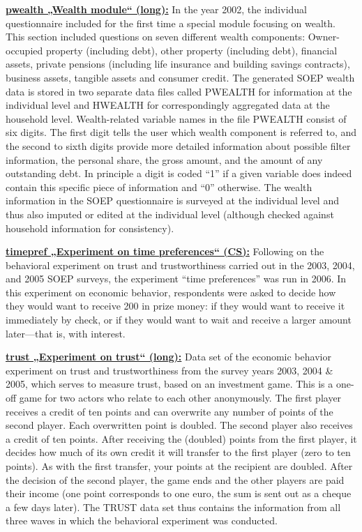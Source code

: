 \documentclass[letterpaper,10pt,openany,onesideH,english]{sphinxmanual}
\begin{document}
 \href{https://paneldata.org/soep-core/data/pwealth}{\textbf{pwealth „Wealth module“ (long):}} In the year 2002, the individual questionnaire included for the first time a special module focusing on wealth. This section included questions on seven different wealth components: Owner-occupied property (including debt), other property (including debt),  financial assets, private pensions (including life insurance and building savings contracts),  business assets,  tangible assets and  consumer credit. The generated SOEP wealth data is stored in two separate data files called PWEALTH for information at the individual level and HWEALTH for correspondingly aggregated data at the household level. Wealth-related variable names in the file PWEALTH consist of six digits. The first digit tells the user which wealth component is referred to, and the second to sixth digits provide more detailed information about possible filter information, the personal share, the gross amount, and the amount of any outstanding debt. In principle a digit is coded “1” if a given variable does indeed contain this specific piece of information and “0” otherwise.  The wealth information in the SOEP questionnaire is surveyed at the individual level and thus also imputed or edited at the individual level (although checked against household information for consistency).

 \href{https://paneldata.org/soep-core/data/timepref}{\textbf{timepref „Experiment on time preferences“ (CS):}} Following on the behavioral experiment on trust and trustworthiness carried out in the 2003, 2004, and 2005 SOEP surveys, the experiment “time preferences” was run in 2006. In this experiment on economic behavior, respondents were asked to decide how they would want to receive \texteuro{}200 in prize money: if they would want to receive it immediately by check, or if they would want to wait and receive a larger amount later—that is, with interest.

 \href{https://paneldata.org/soep-core/data/trust}{\textbf{trust „Experiment on trust“ (long):}} Data set of the economic behavior experiment on trust and trustworthiness from the survey years 2003, 2004 \& 2005, which serves to measure trust, based on an investment game. This is a one-off game for two actors who relate to each other anonymously. The first player receives a credit of ten points and can overwrite any number of points of the second player. Each overwritten point is doubled. The second player also receives a credit of ten points. After receiving the (doubled) points from the first player, it decides how much of its own credit it will transfer to the first player (zero to ten points). As with the first transfer, your points at the recipient are doubled. After the decision of the second player, the game ends and the other players are paid their income (one point corresponds to one euro, the sum is sent out as a cheque a few days later). The TRUST data set thus contains the information from all three waves in which the behavioral experiment was conducted.
\end{document}

